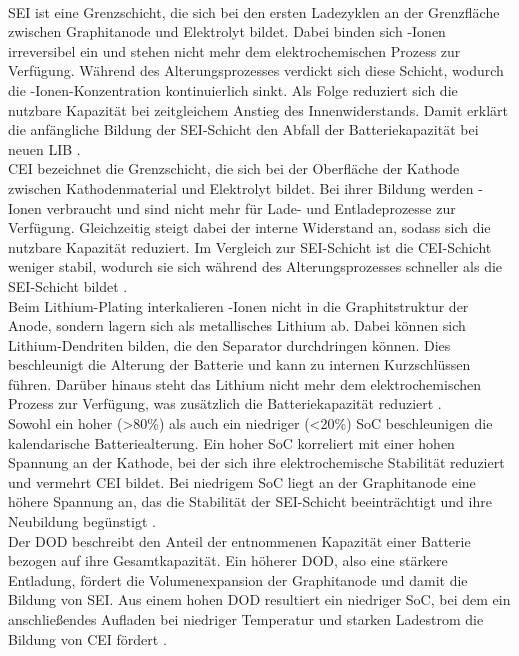 \\
\acs{SEI} ist eine Grenzschicht, die sich bei den ersten Ladezyklen an der Grenzfläche zwischen Graphitanode und Elektrolyt bildet. Dabei binden sich -Ionen irreversibel ein und stehen nicht mehr dem elektrochemischen Prozess zur Verfügung. Während des Alterungsprozesses verdickt sich diese Schicht, wodurch die -Ionen-Konzentration kontinuierlich sinkt. Als Folge reduziert sich die nutzbare Kapazität bei zeitgleichem Anstieg des Innenwiderstands. Damit erklärt die anfängliche Bildung der SEI-Schicht den Abfall der Batteriekapazität bei neuen \acs{LIB} \cite{urlIdBatterieAlterungSEI}.
\\
\acs{CEI} bezeichnet die Grenzschicht, die sich bei der Oberfläche der Kathode zwischen Kathodenmaterial und Elektrolyt bildet. Bei ihrer Bildung werden -Ionen verbraucht und sind nicht mehr für Lade- und Entladeprozesse zur Verfügung. Gleichzeitig steigt dabei der interne Widerstand an, sodass sich die nutzbare Kapazität reduziert. Im Vergleich zur \acs{SEI}-Schicht ist die \acs{CEI}-Schicht weniger stabil, wodurch sie sich während des Alterungsprozesses schneller als die \acs{SEI}-Schicht bildet \cite{urlIdBatterieAlterungCEI}.
\\
Beim Lithium-Plating interkalieren -Ionen nicht in die Graphitstruktur der Anode, sondern lagern sich als metallisches Lithium ab. Dabei können sich Lithium-Dendriten bilden, die den Separator durchdringen können. Dies beschleunigt die Alterung der Batterie und kann zu internen Kurzschlüssen führen. Darüber hinaus steht das Lithium nicht mehr dem elektrochemischen Prozess zur Verfügung, was zusätzlich die Batteriekapazität reduziert \cite{urlIdBatterieAlterungLithiumPlating}.
\\
Sowohl ein hoher (\textgreater 80\%) als auch ein niedriger (\textless 20\%) \acs{SoC} beschleunigen die kalendarische Batteriealterung. Ein hoher \acs{SoC} korreliert mit einer hohen Spannung an der Kathode, bei der sich ihre elektrochemische Stabilität reduziert und vermehrt \acs{CEI} bildet. Bei niedrigem \acs{SoC} liegt an der Graphitanode eine höhere Spannung an, das die Stabilität der \acs{SEI}-Schicht beeinträchtigt und ihre Neubildung begünstigt \cite{urlIdBatterieAlterungVerschiedenerSoCLithiumBatterien}.
\\
Der \acs{DOD} beschreibt den Anteil der entnommenen Kapazität einer Batterie bezogen auf ihre Gesamtkapazität. Ein höherer \acs{DOD}, also eine stärkere Entladung, fördert die Volumenexpansion der Graphitanode und damit die Bildung von \acs{SEI}. Aus einem hohen \acs{DOD} resultiert ein niedriger \acs{SoC}, bei dem ein anschließendes Aufladen bei niedriger Temperatur und starken Ladestrom die Bildung von \acs{CEI} fördert \cite{urlIdAlterungDOD}.
